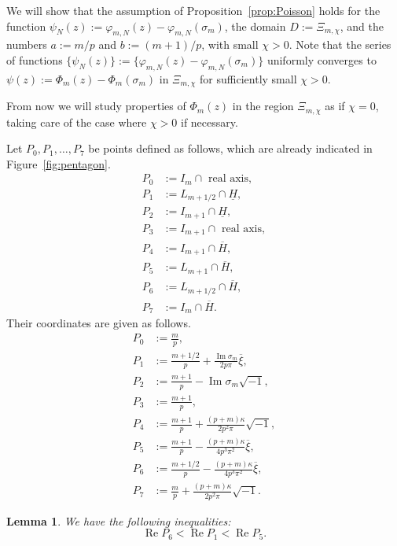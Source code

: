 \documentclass[a4paper,dvipdfmx]{amsart}
\theoremstyle{plain}
\newtheorem{lem}[thm]{Lemma}
\theoremstyle{definition}
\theoremstyle{remark}
\renewcommand{\Re}{\operatorname{Re}}
\renewcommand{\Im}{\operatorname{Im}}
\renewcommand{\i}{\sqrt{-1}}
\newcommand{\saddle}{\sigma}
\numberwithin{equation}{section}
\begin{document}
\par
We will show that the assumption of Proposition~\ref{prop:Poisson} holds for the function $\psi_N(z):=\varphi_{m,N}(z)-\varphi_{m,N}(\saddle_m)$, the domain $D:=\Xi_{m,\chi}$, and the numbers $a:=m/p$ and $b:=(m+1)/p$, with small $\chi>0$.
Note that the series of functions $\{\psi_{N}(z)\}:=\{\varphi_{m,N}(z)-\varphi_{m,N}(\saddle_m)\}$ uniformly converges to $\psi(z):=\Phi_m(z)-\Phi_m(\saddle_m)$ in $\Xi_{m,\chi}$ for sufficiently small $\chi>0$.
\par
From now we will study properties of $\Phi_{m}(z)$ in the region $\Xi_{m,\chi}$ as if $\chi=0$, taking care of the case where $\chi>0$ if necessary.
\par
Let $P_0,P_1,\dots,P_7$ be points defined as follows, which are already indicated in Figure~\ref{fig:pentagon}.
\begin{align*}
  P_0&:=I_m\cap\text{ real axis},
  \\
  P_1&:=L_{m+1/2}\cap\underline{H},
  \\
  P_2&:=I_{m+1}\cap\underline{H},
  \\
  P_3&:=I_{m+1}\cap\text{ real axis},
  \\
  P_4&:=I_{m+1}\cap\overline{H},
  \\
  P_5&:=L_{m+1}\cap\overline{H},
  \\
  P_6&:=L_{m+1/2}\cap\overline{H},
  \\
  P_7&:=I_{m}\cap\overline{H}.
\end{align*}
Their coordinates are given as follows.
\begin{align*}
  P_0&:=\frac{m}{p},
  \\
  P_1&:=\frac{m+1/2}{p}+\frac{\Im\saddle_m}{2p\pi}\overline{\xi},
  \\
  P_2&:=\frac{m+1}{p}-\Im\saddle_m\i,
  \\
  P_3&:=\frac{m+1}{p},
  \\
  P_4&:=\frac{m+1}{p}+\frac{(p+m)\kappa}{2p^2\pi}\i,
  \\
  P_5&:=\frac{m+1}{p}-\frac{(p+m)\kappa}{4p^3\pi^2}\overline{\xi},
  \\
  P_6&:=\frac{m+1/2}{p}-\frac{(p+m)\kappa}{4p^3\pi^2}\overline{\xi},
  \\
  P_7&:=\frac{m}{p}+\frac{(p+m)\kappa}{2p^2\pi}\i.
\end{align*}
\begin{lem}\label{lem:P}
We have the following inequalities:
\begin{equation*}
  \Re{P_6}<\Re{P_{1}}<\Re{P_5}.
\end{equation*}
\end{lem}
\end{document}

